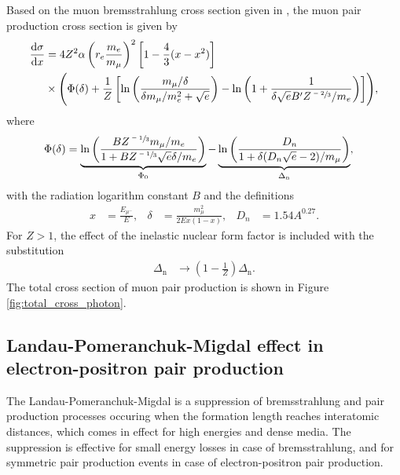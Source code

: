 Based on the muon bremsstrahlung cross section given in \cite{Kelner:288828}, the muon pair production cross section is given by
%
\begin{align}
	\begin{split}
		\frac{\mathrm{d}\sigma}{\mathrm{d}x} &= 4 Z^2 \alpha \left( r_e \frac{m_e}{m_\mu} \right)^2 \left[ 1 - \frac{4}{3} (x - x^2) \right] \\ &\times \Biggl( \Phi(\delta) + \frac{1}{Z} \left[ \ln\left( \frac{m_\mu / \delta}{\delta m_\mu / m_e^2 + \sqrt{e}} \right) - \ln\left( 1 + \frac{1}{\delta \sqrt{e} B^\prime Z^{\sfrac{-2}{3}} / m_e} \right) \right] \Biggr),
	\end{split}
\end{align}
%
where
%
\begin{align}
	\Phi(\delta) &= \underbrace{\ln \left( \frac{B Z^{\sfrac{-1}{3}} m_\mu / m_e}{1 + B Z^{\sfrac{-1}{3}} \sqrt{e} \delta / m_e } \right)}_{\Phi_0} - \underbrace{\ln\left( \frac{D_n}{1 + \delta (D_n \sqrt{e} - 2) / m_\mu} \right)}_{\Delta_\text{n}},
\end{align}
%
with the radiation logarithm constant $B$ and the definitions
%
\begin{align}
	x &= \frac{E_{\mu^-}}{E}, & \delta &= \frac{m_\mu^2}{2 E x (1 - x)}, & D_n &= 1.54 A^{0.27}.
\end{align}
%
For $Z > 1$, the effect of the inelastic nuclear form factor is included with the substitution
%
\begin{align}
	\Delta_\text{n} &\rightarrow \left( 1 - \frac{1}{Z} \right) \Delta_\text{n}.
\end{align}
%
The total cross section of muon pair production is shown in Figure \ref{fig:total_cross_photon}.

\subsection{Landau-Pomeranchuk-Migdal effect in electron-positron pair production}

The Landau-Pomeranchuk-Migdal is a suppression of bremsstrahlung and pair production processes occuring when the formation length reaches interatomic distances, which comes in effect for high energies and dense media.
The suppression is effective for small energy losses in case of bremsstrahlung, and for symmetric pair production events in case of electron-positron pair production.

